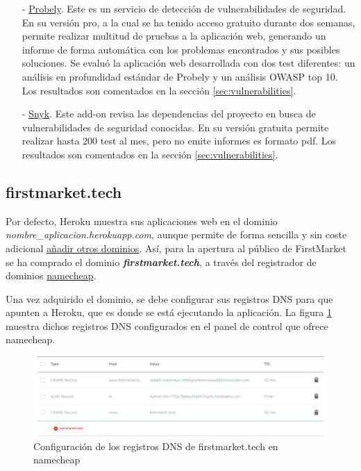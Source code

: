 \documentclass[a4paper]{article}
\begin{document}
\begin{itemize}
       	\item[-] \href{https://elements.heroku.com/addons/probely}{Probely}. Este es un servicio de detección de vulnerabilidades de seguridad. En su versión pro, a la cual se ha tenido acceso gratuito durante dos semanas, permite realizar multitud de pruebas a la aplicación web, generando un informe de forma automática con los problemas encontrados y sus posibles soluciones. Se evaluó la aplicación web desarrollada con dos test diferentes: un análisis en profundidad estándar de Probely y un análisis OWASP top 10. Los resultados son comentados en la sección \ref{sec:vulnerabilities}.
       	\item[-] \href{https://elements.heroku.com/addons/snyk}{Snyk}. Este add-on revisa las dependencias del proyecto en busca de vulnerabilidades de seguridad conocidas. En su versión gratuita permite realizar hasta 200 test al mes, pero no emite informes es formato pdf. Los resultados son comentados en la sección \ref{sec:vulnerabilities}.
    \end{itemize}

	\subsection{firstmarket.tech}
	Por defecto, Heroku muestra sus aplicaciones web en el dominio \emph{nombre\_aplicacion.herokuapp.com}, aunque permite de forma sencilla y sin coste adicional \href{https://devcenter.heroku.com/articles/custom-domains}{añadir otros dominios}. Así, para la apertura al público de FirstMarket se ha comprado el dominio \textbf{\emph{firstmarket.tech}}, a través del registrador de dominios \href{https://www.namecheap.com/}{namecheap}.
	
	Una vez adquirido el dominio, se debe configurar sus registros DNS para que apunten a Heroku, que es donde se está ejecutando la aplicación. La figura \ref{fig:dns} muestra dichos registros DNS configurados en el panel de control que ofrece namecheap.
	
	\begin{figure}[hbt!]
		\centering
		\includegraphics[width=\textwidth,keepaspectratio]{dns}
		\caption{Configuración de los registros DNS de firstmarket.tech en namecheap}
		\label{fig:dns}
	\end{figure}
\end{document}
